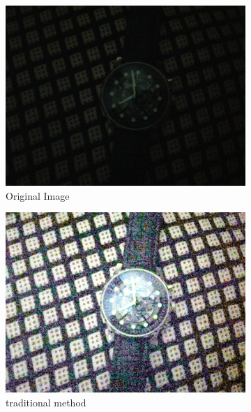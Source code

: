 \documentclass[12pt, a4paper, font = Times New Roman]{article}
\begin{document}
\begin{figure}[!h]
  \begin{subfigure}[b]{0.3\textwidth}
    \includegraphics[width=\textwidth]{watch.jpg}
    \caption{Original Image}
    \label{fig:orig}
  \end{subfigure}
  \begin{subfigure}[b]{0.3\textwidth}
    \includegraphics[width=\textwidth]{hist_watch.jpg}
    \caption{traditional method}
    \label{fig:hist_wat}
  \end{subfigure}
   \begin{subfigure}[b]{0.3\textwidth}

\end{subfigure}
\end{figure}
\end{document}
